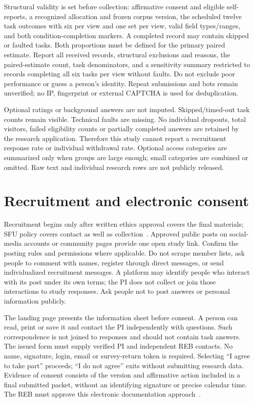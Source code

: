 \documentclass[11pt,letterpaper]{article}
\begin{document}
Structural validity is set before collection: affirmative consent and eligible self-reports, a recognized allocation and frozen corpus version, the scheduled twelve task outcomes with six per view and one set per view, valid field types/ranges, and both condition-completion markers. A completed record may contain skipped or faulted tasks. Both proportions must be defined for the primary paired estimate. Report all received records, structural exclusions and reasons, the paired-estimate count, task denominators, and a sensitivity summary restricted to records completing all six tasks per view without faults. Do not exclude poor performance or guess a person's identity. Repeat submissions and bots remain unverified; no IP, fingerprint or external CAPTCHA is used for deduplication.

Optional ratings or background answers are not imputed. Skipped/timed-out task counts remain visible. Technical faults are missing. No individual dropouts, total visitors, failed eligibility counts or partially completed answers are retained by the research application. Therefore this study cannot report a recruitment response rate or individual withdrawal rate. Optional access categories are summarized only when groups are large enough; small categories are combined or omitted. Raw text and individual research rows are not publicly released.

\section{Recruitment and electronic consent}
Recruitment begins only after written ethics approval covers the final materials; SFU policy covers contact as well as collection~\cite{sfu-policy}. Approved public posts on social-media accounts or community pages provide one open study link. Confirm the posting rules and permissions where applicable. Do not scrape member lists, ask people to comment with names, register through direct messages, or send individualized recruitment messages. A platform may identify people who interact with its post under its own terms; the PI does not collect or join those interactions to study responses. Ask people not to post answers or personal information publicly.

The landing page presents the information sheet before consent. A person can read, print or save it and contact the PI independently with questions. Such correspondence is not joined to responses and should not contain task answers. The issued form must supply verified PI and independent REB contacts. No name, signature, login, email or survey-return token is required. Selecting ``I agree to take part'' proceeds; ``I do not agree'' exits without submitting research data. Evidence of consent consists of the version and affirmative action included in a final submitted packet, without an identifying signature or precise calendar time. The REB must approve this electronic documentation approach~\cite{tcps-consent}.
\end{document}
